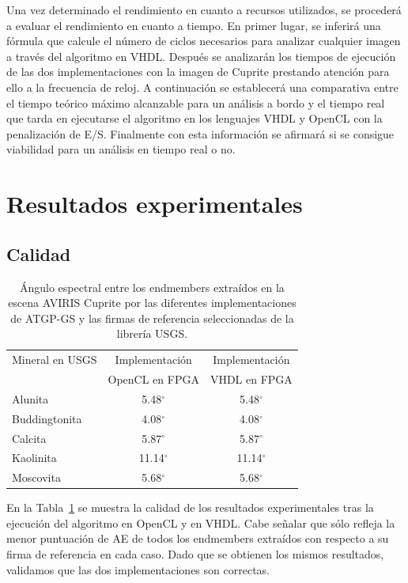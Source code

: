 Una vez determinado el rendimiento en cuanto a recursos utilizados, se procederá a evaluar el rendimiento en cuanto a tiempo. En primer lugar, se inferirá una fórmula que calcule el número de ciclos necesarios para analizar cualquier imagen a través del algoritmo en VHDL. Después se analizarán los tiempos de ejecución de las dos implementaciones con la imagen de Cuprite prestando atención para ello a la frecuencia de reloj. A continuación se establecerá una comparativa entre el tiempo teórico máximo alcanzable para un análisis a bordo y el tiempo real que tarda en ejecutarse el algoritmo en los lenguajes VHDL y OpenCL con la penalización de E/S. Finalmente con esta información se afirmará si se consigue viabilidad para un análisis en tiempo real o no.

\section{Resultados experimentales}

\subsection{Calidad}

\begin{table}[htbp]
	\centering
	\begin{tabular}{|l|c|c|}
		\hline
		Mineral en USGS & Implementación & Implementación \\
		 & OpenCL en FPGA & VHDL en FPGA \\ \hline \hline
		Alunita & 5.48$^{\circ}$ & 5.48$^{\circ}$ \\ \hline 
		Buddingtonita & 4.08$^{\circ}$ & 4.08$^{\circ}$ \\ \hline 
		Calcita & 5.87$^{\circ}$ & 5.87$^{\circ}$ \\ \hline 
		Kaolinita & 11.14$^{\circ}$ & 11.14$^{\circ}$ \\ \hline 
		Moscovita & 5.68$^{\circ}$ & 5.68$^{\circ}$ \\ \hline 
	\end{tabular}
	\caption{Ángulo espectral entre los endmembers extraídos en la escena AVIRIS Cuprite por las diferentes implementaciones de ATGP-GS y las firmas de referencia seleccionadas de la librería USGS.}
	\label{tabla2}
\end{table}

En la Tabla~\ref{tabla2} se muestra la calidad de los resultados experimentales tras la ejecución del algoritmo en OpenCL y en VHDL. Cabe señalar que sólo refleja la menor puntuación de AE de todos los endmembers extraídos con respecto a su firma de referencia en cada caso. Dado que se obtienen los mismos resultados, validamos que las dos implementaciones son correctas.

